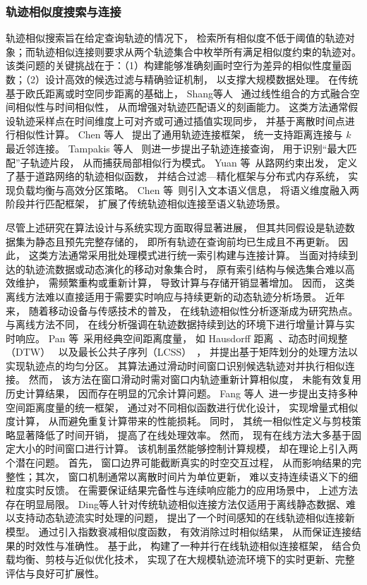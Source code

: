 \subsubsection*{轨迹相似度搜索与连接}

轨迹相似搜索旨在给定查询轨迹的情况下， 检索所有相似度不低于阈值的轨迹对象；而轨迹相似连接则要求从两个轨迹集合中枚举所有满足相似度约束的轨迹对。 该类问题的关键挑战在于：（1）构建能够准确刻画时空行为差异的相似性度量函数；（2）设计高效的候选过滤与精确验证机制， 以支撑大规模数据处理。 在传统基于欧氏距离或时空同步距离的基础上， Shang等人~ 通过线性组合的方式融合空间相似性与时间相似性， 从而增强对轨迹匹配语义的刻画能力。 这类方法通常假设轨迹采样点在时间维度上可对齐或可通过插值实现同步， 并基于离散时间点进行相似性计算。 Chen 等人~ 提出了通用轨迹连接框架， 统一支持距离连接与 $k$ 最近邻连接。 Tampakis 等人~ 则进一步提出子轨迹连接查询， 用于识别“最大匹配”子轨迹片段， 从而捕获局部相似行为模式。 Yuan 等~从路网约束出发， 定义了基于道路网络的轨迹相似函数， 并结合过滤—精化框架与分布式内存系统， 实现负载均衡与高效分区策略。 Chen 等~则引入文本语义信息， 将语义维度融入两阶段并行匹配框架， 扩展了传统轨迹相似连接至语义轨迹场景。

尽管上述研究在算法设计与系统实现方面取得显著进展， 但其共同假设是轨迹数据集为静态且预先完整存储的， 即所有轨迹在查询前均已生成且不再更新。 因此， 这类方法通常采用批处理模式进行统一索引构建与连接计算。 当面对持续到达的轨迹流数据或动态演化的移动对象集合时， 原有索引结构与候选集合难以高效维护， 需频繁重构或重新计算， 导致计算与存储开销显著增加。 因而， 这类离线方法难以直接适用于需要实时响应与持续更新的动态轨迹分析场景。 近年来， 随着移动设备与传感技术的普及， 在线轨迹相似性分析逐渐成为研究热点。 与离线方法不同， 在线分析强调在轨迹数据持续到达的环境下进行增量计算与实时响应。 Pan 等~采用经典空间距离度量， 如 Hausdorff 距离~、动态时间规整（DTW）~ 以及最长公共子序列（LCSS）~， 并提出基于矩阵划分的处理方法以实现轨迹点的均匀分区。 其算法通过滑动时间窗口识别候选轨迹对并执行相似连接。 然而， 该方法在窗口滑动时需对窗口内轨迹重新计算相似度， 未能有效复用历史计算结果， 因而存在明显的冗余计算问题。 Fang 等人~进一步提出支持多种空间距离度量的统一框架， 通过对不同相似函数进行优化设计， 实现增量式相似度计算， 从而避免重复计算带来的性能损耗。 同时， 其统一相似性定义与剪枝策略显著降低了时间开销， 提高了在线处理效率。
然而， 现有在线方法大多基于固定大小的时间窗口进行计算。 该机制虽然能够控制计算规模， 却在理论上引入两个潜在问题。 首先， 窗口边界可能截断真实的时空交互过程， 从而影响结果的完整性；其次， 窗口机制通常以离散时间片为单位更新， 难以支持连续语义下的细粒度实时反馈。 在需要保证结果完备性与连续响应能力的应用场景中， 上述方法存在明显局限。 Ding等人针对传统轨迹相似连接方法仅适用于离线静态数据、难以支持动态轨迹流实时处理的问题， 提出了一个时间感知的在线轨迹相似连接新模型。 通过引入指数衰减相似度函数， 有效消除过时相似结果， 从而保证连接结果的时效性与准确性。 基于此， 构建了一种并行在线轨迹相似连接框架， 结合负载均衡、剪枝与近似优化技术， 实现了在大规模轨迹流环境下的实时更新、完整评估与良好可扩展性。



